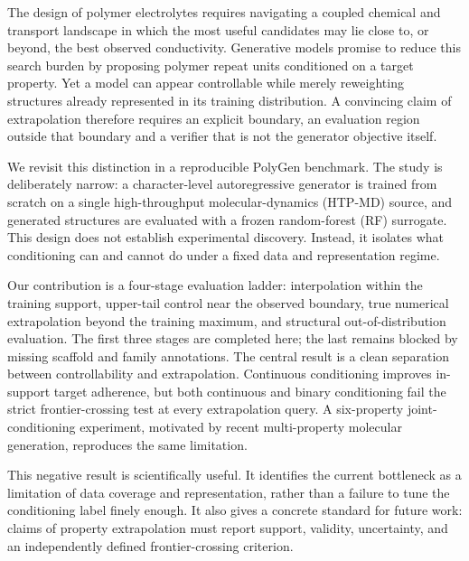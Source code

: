 The design of polymer electrolytes requires navigating a coupled chemical and transport landscape in which the most useful candidates may lie close to, or beyond, the best observed conductivity. Generative models promise to reduce this search burden by proposing polymer repeat units conditioned on a target property. Yet a model can appear controllable while merely reweighting structures already represented in its training distribution. A convincing claim of extrapolation therefore requires an explicit boundary, an evaluation region outside that boundary and a verifier that is not the generator objective itself.

We revisit this distinction in a reproducible PolyGen benchmark. The study is deliberately narrow: a character-level autoregressive generator is trained from scratch on a single high-throughput molecular-dynamics (HTP-MD) source, and generated structures are evaluated with a frozen random-forest (RF) surrogate. This design does not establish experimental discovery. Instead, it isolates what conditioning can and cannot do under a fixed data and representation regime.

Our contribution is a four-stage evaluation ladder: interpolation within the training support, upper-tail control near the observed boundary, true numerical extrapolation beyond the training maximum, and structural out-of-distribution evaluation. The first three stages are completed here; the last remains blocked by missing scaffold and family annotations. The central result is a clean separation between controllability and extrapolation. Continuous conditioning improves in-support target adherence, but both continuous and binary conditioning fail the strict frontier-crossing test at every extrapolation query. A six-property joint-conditioning experiment, motivated by recent multi-property molecular generation, reproduces the same limitation.

This negative result is scientifically useful. It identifies the current bottleneck as a limitation of data coverage and representation, rather than a failure to tune the conditioning label finely enough. It also gives a concrete standard for future work: claims of property extrapolation must report support, validity, uncertainty, and an independently defined frontier-crossing criterion.
